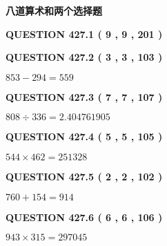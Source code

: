 \documentclass{ctexart}
\begin{document}
   
   
   
   
   
 \vspace{0.2in}
{\LARGE {\textbf{ 八道算术和两个选择题}}}
   
   
  
\vspace{0.2in}
  
{\textbf{\Large{QUESTION
427.1 
 ( 9 , 9 , 201 )
}}}
  
  
  
\vspace{0.2in}
  
{\textbf{\Large{QUESTION
427.2 
 ( 3 , 3 , 103 )
}}}
  
  
 
 

$ %
853 -  %
294=   %
559$
 
 
  
\vspace{0.2in}
  
{\textbf{\Large{QUESTION
427.3 
 ( 7 , 7 , 107 )
}}}
  
  
 
 

$ %
808 \div  %
336=   %
2.404761905$
 
 
  
\vspace{0.2in}
  
{\textbf{\Large{QUESTION
427.4 
 ( 5 , 5 , 105 )
}}}
  
  
 
 

$ %
544 \times  %
462=   %
251328$
 
 
  
\vspace{0.2in}
  
{\textbf{\Large{QUESTION
427.5 
 ( 2 , 2 , 102 )
}}}
  
  
 
 

$ %
760 +  %
154=   %
914$
 
 
  
\vspace{0.2in}
  
{\textbf{\Large{QUESTION
427.6 
 ( 6 , 6 , 106 )
}}}
  
  
 
 

$ %
943 \times  %
315=   %
297045$
 
\end{document}
